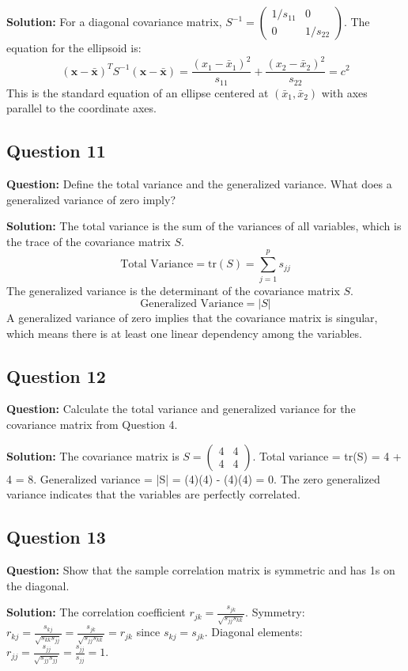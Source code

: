 \textbf{Solution:}
For a diagonal covariance matrix, $S^{-1} = \begin{pmatrix} 1/s_{11} & 0 \\ 0 & 1/s_{22} \end{pmatrix}$.
The equation for the ellipsoid is:
$$ (\mathbf{x}-\bar{\mathbf{x}})^T S^{-1} (\mathbf{x}-\bar{\mathbf{x}}) = \frac{(x_1-\bar{x}_1)^2}{s_{11}} + \frac{(x_2-\bar{x}_2)^2}{s_{22}} = c^2 $$
This is the standard equation of an ellipse centered at $(\bar{x}_1, \bar{x}_2)$ with axes parallel to the coordinate axes.

\subsection*{Question 11}
\textbf{Question:} Define the total variance and the generalized variance. What does a generalized variance of zero imply?

\textbf{Solution:}
The total variance is the sum of the variances of all variables, which is the trace of the covariance matrix $S$.
$$ \text{Total Variance} = \text{tr}(S) = \sum_{j=1}^{p} s_{jj} $$
The generalized variance is the determinant of the covariance matrix $S$.
$$ \text{Generalized Variance} = |S| $$
A generalized variance of zero implies that the covariance matrix is singular, which means there is at least one linear dependency among the variables.

\subsection*{Question 12}
\textbf{Question:} Calculate the total variance and generalized variance for the covariance matrix from Question 4.

\textbf{Solution:}
The covariance matrix is $S = \begin{pmatrix} 4 & 4 \\ 4 & 4 \end{pmatrix}$.
Total variance = tr(S) = 4 + 4 = 8.
Generalized variance = |S| = (4)(4) - (4)(4) = 0.
The zero generalized variance indicates that the variables are perfectly correlated.

\subsection*{Question 13}
\textbf{Question:} Show that the sample correlation matrix is symmetric and has 1s on the diagonal.

\textbf{Solution:}
The correlation coefficient $r_{jk} = \frac{s_{jk}}{\sqrt{s_{jj}s_{kk}}}$.
Symmetry: $r_{kj} = \frac{s_{kj}}{\sqrt{s_{kk}s_{jj}}} = \frac{s_{jk}}{\sqrt{s_{jj}s_{kk}}} = r_{jk}$ since $s_{kj}=s_{jk}$.
Diagonal elements: $r_{jj} = \frac{s_{jj}}{\sqrt{s_{jj}s_{jj}}} = \frac{s_{jj}}{s_{jj}} = 1$.

